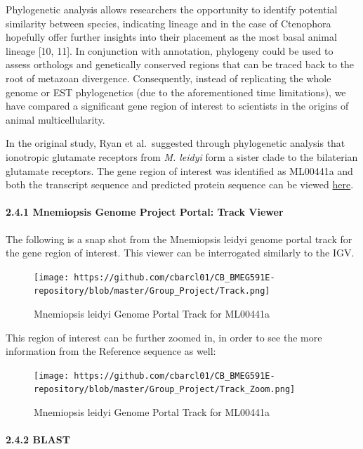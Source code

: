 \documentclass[
]{article}
\begin{document}
Phylogenetic analysis allows researchers the opportunity to identify
potential similarity between species, indicating lineage and in the case
of Ctenophora hopefully offer further insights into their placement as
the most basal animal lineage {[}10, 11{]}. In conjunction with
annotation, phylogeny could be used to assess orthologs and genetically
conserved regions that can be traced back to the root of metazoan
divergence. Consequently, instead of replicating the whole genome or EST
phylogenetics (due to the aforementioned time limitations), we have
compared a significant gene region of interest to scientists in the
origins of animal multicellularity.

In the original study, Ryan et al.~suggested through phylogenetic
analysis that ionotropic glutamate receptors from \emph{M. leidyi} form
a sister clade to the bilaterian glutamate receptors. The gene region of
interest was identified as ML00441a and both the transcript sequence and
predicted protein sequence can be viewed
\href{https://research.nhgri.nih.gov/mnemiopsis/wiki/index.php/ML00441a}{here}.

\hypertarget{mnemiopsis-genome-project-portal-track-viewer}{%
\paragraph{2.4.1 Mnemiopsis Genome Project Portal: Track
Viewer}\label{mnemiopsis-genome-project-portal-track-viewer}}

The following is a snap shot from the Mnemiopsis leidyi genome portal
track for the gene region of interest. This viewer can be interrogated
similarly to the IGV.

\begin{figure}
\centering
\texttt{[image: https://github.com/cbarcl01/CB\_BMEG591E-repository/blob/master/Group\_Project/Track.png]}
\caption{Mnemiopsis leidyi Genome Portal Track for ML00441a}
\end{figure}

This region of interest can be further zoomed in, in order to see the
more information from the Reference sequence as well:

\begin{figure}
\centering
\texttt{[image: https://github.com/cbarcl01/CB\_BMEG591E-repository/blob/master/Group\_Project/Track\_Zoom.png]}
\caption{Mnemiopsis leidyi Genome Portal Track for ML00441a}
\end{figure}

\hypertarget{blast}{%
\paragraph{2.4.2 BLAST}\label{blast}}
\end{document}
